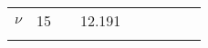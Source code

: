 \begin{tabular}{cccc c cccc}
$\nu$ & 15 &  & 12.191  & & & & & \\ 
 &  & & \begin{scriptsize} [8,16.4] \end{scriptsize}  & & & & &  \\ 
\bottomrule 
\end{tabular}
